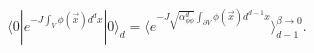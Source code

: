 \begin{equation}
\label{E:dimredexp}
    \langle 0| e^{-J \int_V \phi (\vec{x}) d^dx}|0 \rangle_{d}
    = \langle e^{-J \sqrt{\alpha^d_{\phi\phi}}\int_{\partial V} \phi (\vec{x})
    d^{d-1}x}\rangle_{d-1}^{\beta \to 0}.
\end{equation}

